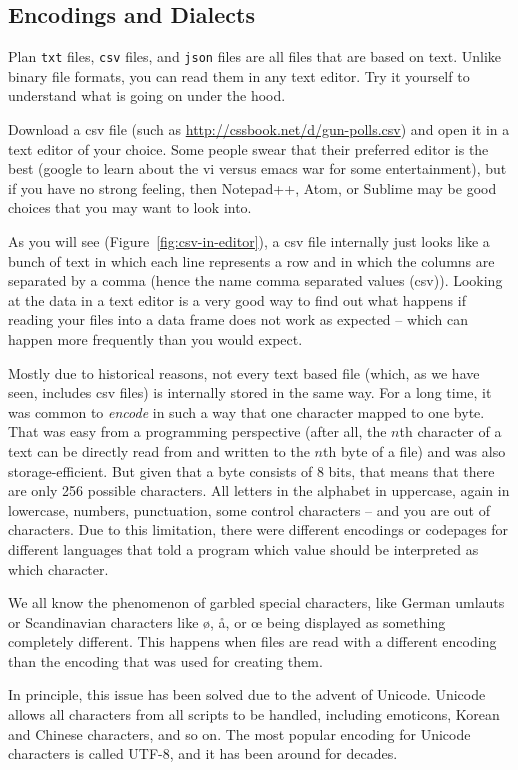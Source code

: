 \subsection{Encodings and Dialects}
\label{sec:encodings}
Plan \verb|txt| files, \verb|csv| files, and \verb|json| files are all files that are based on text. Unlike binary file formats, you can read them in any text editor. Try it yourself to understand what is going on under the hood.

Download a csv file (such as \url{http://cssbook.net/d/gun-polls.csv})
and open it in a text editor of your choice. Some people swear that their preferred editor is the best (google to learn about the vi versus emacs war for some entertainment), but if you have no strong feeling, then Notepad++, Atom, or Sublime may be good choices that you may want to look into.

As you will see (Figure~\ref{fig:csv-in-editor}), a csv file internally just looks like a bunch of text in which each line represents a row and in which the columns are separated by a comma (hence the name comma separated values (csv)).
Looking at the data in a text editor is a very good way to find out what happens if reading your files into a data frame does not work as expected -- which can happen more frequently than you would expect.

Mostly due to historical reasons, not every text based file (which, as we have seen, includes csv files) is internally stored in the same way.
For a long time, it was common to \emph{encode} in such a way that one character mapped to one byte. That was easy from a programming perspective (after all, the $n$th character of a text can be directly  read from and written to the $n$th byte of a file) and was also storage-efficient. But given that a byte consists of 8 bits, that means that there are only 256 possible characters. All letters in the alphabet in uppercase, again in lowercase, numbers, punctuation, some control characters -- and you are out of characters. Due to this limitation, there were different encodings or codepages for different languages that told a program which value should be interpreted as which character.

We all know the phenomenon of garbled special characters, like German umlauts or Scandinavian characters like ø, å, or œ being displayed as something completely different. This happens when files are read with a different encoding than the encoding that was used for creating them.

In principle, this issue has been solved due to the advent of Unicode. Unicode allows all characters from all scripts to be handled, including emoticons, Korean and Chinese characters, and so on. The most popular encoding for Unicode characters is called UTF-8, and it has been around for decades.

